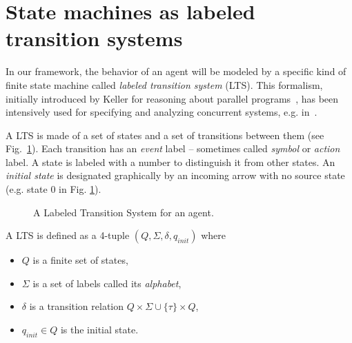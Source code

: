 \section{State machines as labeled transition systems\label{section:background-state-machines}}

In our framework, the behavior of an agent will be modeled by a specific kind of finite state machine called \emph{labeled transition system} (LTS). This formalism, initially introduced by Keller for reasoning about parallel programs~\cite{Keller:1976}, has been intensively used for specifying and analyzing concurrent systems, e.g. in~\cite{Milner:1989, Clarke:1989, Magee:1997}. 

A LTS is made of a set of states and a set of transitions between them (see Fig.~\ref{image:framework-start-stop}). Each transition has an \emph{event} label -- sometimes called \emph{symbol} or \emph{action} label. A state is labeled with a number to distinguish it from other states. An \emph{initial state} is designated graphically by an incoming arrow with no source state (e.g. state 0 in Fig. \ref{image:framework-start-stop}). 

\begin{figure}[H]
\centering{}
  \caption{A Labeled Transition System for an  agent\label{image:framework-start-stop}.}
\end{figure}

\begin{definition}
A LTS is defined as a 4-tuple $(Q,\Sigma,\delta,q_{init})$ where
\begin{itemize}
\item $Q$ is a finite set of states,
\item $\Sigma$ is a set of labels called its \emph{alphabet}, 
\item $\delta$ is a transition relation $Q \times \Sigma\cup\{\tau\} \times Q$,
\item $q_{init} \in Q$ is the initial state. 
\end{itemize}
\end{definition}

